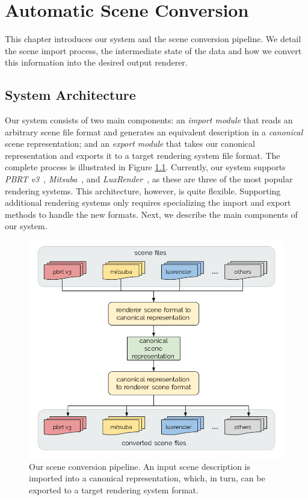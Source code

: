 \chapter{Automatic Scene Conversion} 
\label{sec:systemarch}
This chapter introduces our system and the scene conversion pipeline. We detail the scene import process, the intermediate state of the data and how we convert this information into the desired output renderer.

\section{System Architecture}

Our system consists of two main components: an {\it import module} that reads an arbitrary scene file format and generates an equivalent description in a {\it canonical} scene representation; and an {\it export module} that takes our canonical representation and exports it to a target rendering system file format. The complete process is illustrated in Figure \ref{fig:sysarch}. Currently, our system supports \textit{PBRT v3}~\cite{PBRT:v3}, \textit{Mitsuba}~\cite{mitsuba}, and \textit{LuxRender}~\cite{luxrender}, as these are three of the most popular rendering systems. This architecture, however, is quite flexible. Supporting additional rendering systems only requires specializing the import and export methods to handle the new formats. Next, we describe the main components of our system.

\begin{figure}[h]
  \includegraphics[width=\textwidth,height=\textheight,keepaspectratio]{images/4_system_architecture/architecture.png}
  \caption{Our scene conversion pipeline. An input scene description is imported into a canonical representation, which, in turn, can be exported to a target rendering system format.}
  \label{fig:sysarch}
\end{figure}

